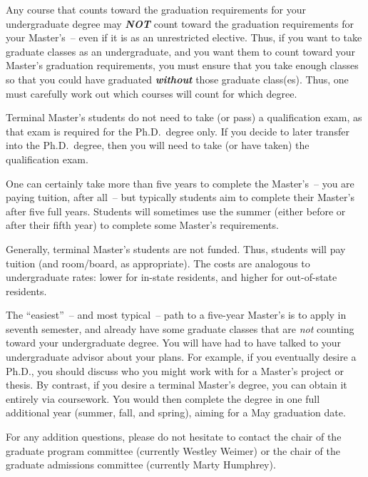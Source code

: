 Any course that counts toward the graduation requirements for your
undergraduate degree may {\em\bf NOT} count toward the graduation
requirements for your Master's~-- even if it is as an unrestricted
elective.  Thus, if you want to take graduate classes as an undergraduate,
and you want them to count toward your Master's graduation requirements,
you must ensure that you take enough classes so that you could have
graduated {\em\bf without} those graduate class(es).  Thus, one must
carefully work out which courses will count for which degree. 

Terminal Master's students do not need to take (or pass) a qualification
exam, as that exam is required for the Ph.D.\ degree only.  If you decide
to later transfer into the Ph.D.\ degree, then you will need to take (or
have taken) the qualification exam.

One can certainly take more than five years to complete the Master's~--
you are paying tuition, after all~-- but typically students aim to
complete their Master's after five full years. Students will sometimes use
the summer (either before or after their fifth year) to complete some
Master's requirements.  


Generally, terminal Master's students are not funded.  Thus, students will
pay tuition (and room/board, as appropriate).  The costs are analogous to
undergraduate rates: lower for in-state residents, and higher for
out-of-state residents.

The ``easiest''~-- and most typical~-- path to a five-year Master's is to
apply in seventh semester, and already have some graduate classes that are
\emph{not} counting toward your undergraduate degree. You will have had to
have talked to your undergraduate advisor about your plans. For example,
if you eventually desire a Ph.D., you should discuss who you might work
with for a Master's project or thesis. By contrast, if you desire a
terminal Master's degree, you can obtain it entirely via coursework. 
You would then complete the degree in one full additional year (summer,
fall, and spring), aiming for a May graduation date.

For any addition questions, please do not hesitate to contact the chair of
the graduate program committee (currently Westley Weimer) or the chair of
the graduate admissions committee (currently Marty Humphrey).
